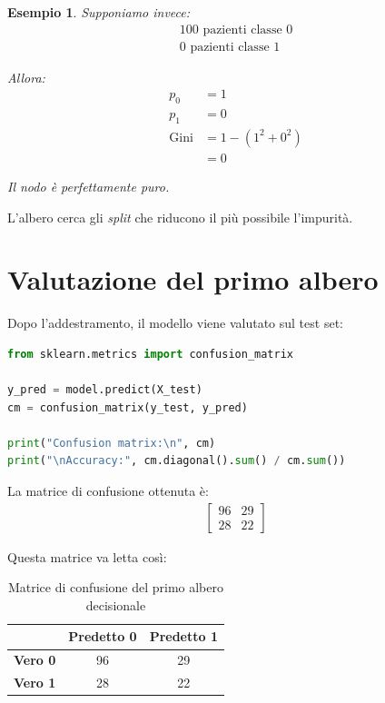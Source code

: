 \documentclass[11pt,a4paper]{article}
\newtheorem{example}{Esempio}
\begin{document}
\begin{example}
Supponiamo invece:
\begin{align*}
    100 \text{ pazienti classe } 0 \\
    0 \text{ pazienti classe } 1
\end{align*}

Allora:
\begin{align*}
    p_0 &= 1 \\
    p_1 &= 0 \\
    \text{Gini} &= 1 - (1^2 + 0^2) \\
               &= 0
\end{align*}

Il nodo è perfettamente puro.
\end{example}

L'albero cerca gli \textit{split} che riducono il più possibile l'impurità.

\section{Valutazione del primo albero}
Dopo l'addestramento, il modello viene valutato sul test set:

\begin{lstlisting}[language=Python]
from sklearn.metrics import confusion_matrix

y_pred = model.predict(X_test)
cm = confusion_matrix(y_test, y_pred)

print("Confusion matrix:\n", cm)
print("\nAccuracy:", cm.diagonal().sum() / cm.sum())
\end{lstlisting}

La matrice di confusione ottenuta è:
\begin{align*}
    \begin{bmatrix}
        96 & 29 \\
        28 & 22
    \end{bmatrix}
\end{align*}

Questa matrice va letta così:

\begin{table}[H]
\centering
\caption{Matrice di confusione del primo albero decisionale}
\label{tab:confusion_matrix_1}
\begin{tabular}{lcc}
\toprule
 & \textbf{Predetto 0} & \textbf{Predetto 1} \\
\midrule
\textbf{Vero 0} & 96 & 29 \\
\textbf{Vero 1} & 28 & 22 \\
\bottomrule
\end{tabular}
\end{table}
\end{document}
